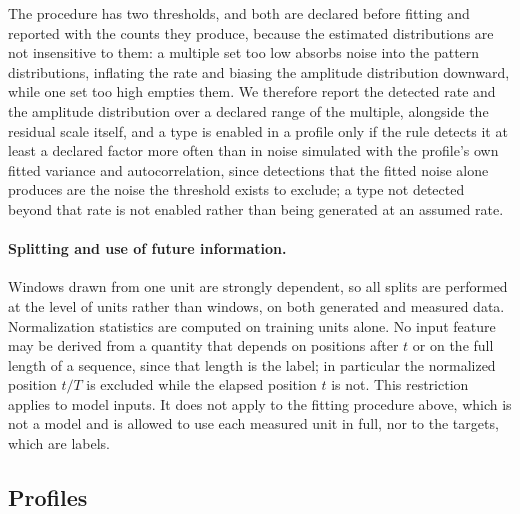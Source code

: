 \documentclass{article}
\newif\ifreview \reviewtrue        %
\newcommand{\rev}[1]{\ifreview\textcolor[HTML]{0B5FA5}{#1}\else#1\fi}
\newcommand{\revwhy}[1]{\ifreview\marginpar{\footnotesize\raggedright\textcolor[HTML]{0B5FA5}{#1}}\fi}
\begin{document}
The procedure has two thresholds, and both are declared before fitting and reported with the counts they produce, because the estimated distributions are not insensitive to them: a multiple set too low absorbs noise into the pattern distributions, inflating the rate and biasing the amplitude distribution downward, while one set too high empties them. We therefore report the detected rate and the amplitude distribution over a declared range of the multiple, alongside the residual scale itself, and a type \rev{is enabled in a profile only if the rule detects it at least a declared factor more often than in noise simulated with the profile's own fitted variance and autocorrelation, since detections that the fitted noise alone produces are the noise the threshold exists to exclude; a type not detected beyond that rate is not enabled} rather than being generated at an assumed rate.\revwhy{D05: enable only above the noise rate}
 
\paragraph{Splitting and use of future information.}
Windows drawn from one unit are strongly dependent, so all splits are performed at the level of units rather than windows, on both generated and measured data. Normalization statistics are computed on training units alone. No input feature may be derived from a quantity that depends on positions after $t$ or on the full length of a sequence, since that length is the label; in particular the normalized position $t/T$ is excluded while the elapsed position $t$ is not. This restriction applies to model inputs. It does not apply to the fitting procedure above, which is not a model and is allowed to use each measured unit in full, nor to the targets, which are labels.
 
\subsection{Profiles}
\label{sec:profiles}
 
\end{document}
